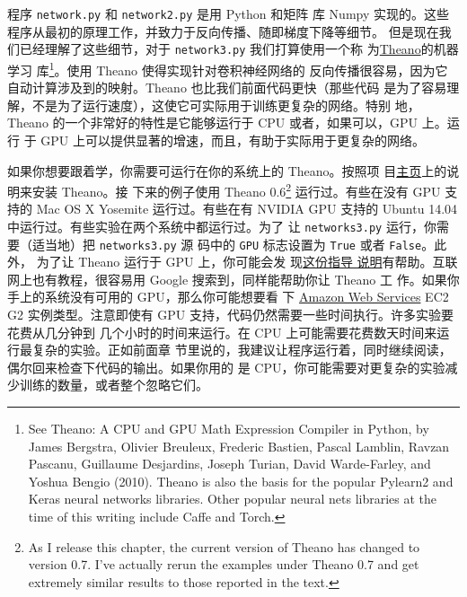 程序 \lstinline!network.py! 和 \lstinline!network2.py! 是用 Python 和矩阵
库 Numpy 实现的。这些程序从最初的原理工作，并致力于反向传播、随即梯度下降等细节。
但是现在我们已经理解了这些细节，对于 \lstinline!network3.py! 我们打算使用一个称
为\href{http://deeplearning.net/software/theano/}{Theano}的机器学习
库\footnote{See Theano: A CPU and GPU Math Expression Compiler in Python, by
  James Bergstra, Olivier Breuleux, Frederic Bastien, Pascal Lamblin, Ravzan
  Pascanu, Guillaume Desjardins, Joseph Turian, David Warde-Farley, and Yoshua
  Bengio (2010). Theano is also the basis for the popular Pylearn2 and Keras
  neural networks libraries. Other popular neural nets libraries at the time of
  this writing include Caffe and Torch.}。使用 Theano 使得实现针对卷积神经网络的
反向传播很容易，因为它自动计算涉及到的映射。Theano 也比我们前面代码更快（那些代码
是为了容易理解，不是为了运行速度），这使它可实际用于训练更复杂的网络。特别
地，Theano 的一个非常好的特性是它能够运行于 CPU 或者，如果可以，GPU 上。运行
于 GPU 上可以提供显著的增速，而且，有助于实际用于更复杂的网络。

如果你想要跟着学，你需要可运行在你的系统上的 Theano。按照项
目\href{http://deeplearning.net/software/theano/}{主页}上的说明来安装 Theano。接
下来的例子使用 Theano 0.6\footnote{As I release this chapter, the current
  version of Theano has changed to version 0.7. I've actually rerun the examples
  under Theano 0.7 and get extremely similar results to those reported in the
  text.} 运行过。有些在没有 GPU 支持的 Mac OS X Yosemite 运行过。有些在有 NVIDIA
GPU 支持的 Ubuntu 14.04 中运行过。有些实验在两个系统中都运行过。为了
让 \lstinline!networks3.py! 运行，你需要（适当地）把 \lstinline!networks3.py! 源
码中的 \lstinline!GPU! 标志设置为 \lstinline!True! 或者 \lstinline!False!。此外，
为了让 Theano 运行于 GPU 上，你可能会发
现\href{http://deeplearning.net/software/theano/tutorial/using_gpu.html}{这份指导
  说明}有帮助。互联网上也有教程，很容易用 Google 搜索到，同样能帮助你让 Theano 工
作。如果你手上的系统没有可用的 GPU，那么你可能想要看
下 \href{http://aws.amazon.com/ec2/instance-types/}{Amazon Web Services} EC2 G2
实例类型。注意即使有 GPU 支持，代码仍然需要一些时间执行。许多实验要花费从几分钟到
几个小时的时间来运行。在 CPU 上可能需要花费数天时间来运行最复杂的实验。正如前面章
节里说的，我建议让程序运行着，同时继续阅读，偶尔回来检查下代码的输出。如果你用的
是 CPU，你可能需要对更复杂的实验减少训练\epochs{}的数量，或者整个忽略它们。

